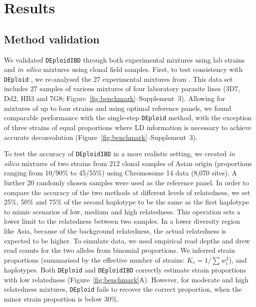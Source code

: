 \documentclass[9pt,lineno]{elife}
\begin{document}
\section{Results}

\subsection{Method validation}

We validated \texttt{DEploidIBD} through both experimental mixtures using lab strains and {\it in silico} mixtures using clonal field samples.  First, to test consistency with \texttt{DEploid} \citet{Zhu2017}, we re-analysed the 27 experimental mixtures from \citep{Wendler2015}.  This data set includes 27 samples of various mixtures of four laboratory parasite lines (3D7, Dd2, HB3 and 7G8; Figure~\ref{fig:benchmark}--Supplement~3).  Allowing for mixtures of up to four strains and using optimal reference panels, we found comparable performance with the single-step \texttt{DEploid} method, with the exception of three strains of equal proportions where LD information is necessary to achieve accurate deconvolution (Figure~\ref{fig:benchmark}--Supplement~3).

To test the accuracy of \texttt{DEploidIBD} in a more realistic setting, we created {\it in silico} mixtures of two strains from 212 clonal samples of Asian origin (proportions ranging from 10/90\% to 45/55\%) using Chromosome 14 data (8,070 sites).  A further 20 randomly chosen samples were used as the reference panel. In order to compare the accuracy of the two methods at different levels of relatedness, we set 25\%, 50\% and 75\% of the second haplotype to be the same as the first haplotype to mimic scenarios of low, medium and high relatedness. This operation sets a lower limit to the relatedness between two samples. In a lower diversity region like Asia, because of the background relatedness, the actual relatedness is expected to be higher.  To simulate data, we used empirical read depths and drew read counts for the two alleles from binomial proportions.  We inferred strain proportions (summarised by the effective number of strains: $K_e = 1/\sum w_{i}^{2}$), and haplotypes. Both \texttt{DEploid} and \texttt{DEploidIBD} correctly estimate strain proportions with low relatedness (Figure~\ref{fig:benchmark}A). However, for moderate and high relatedness mixtures, \texttt{DEploid} fails to recover the correct proportion, when the minor strain proportion is below 30\%.
\end{document}
